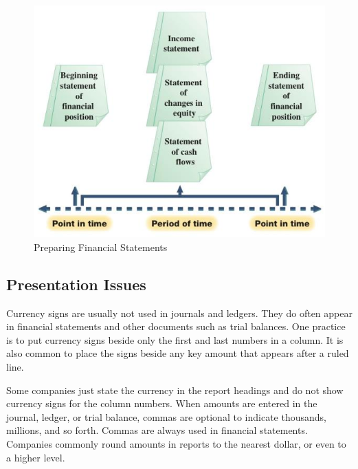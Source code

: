 \documentclass[../main.tex]{subfiles}
\begin{document}
	\begin{figure}[ht]
		\centering
		\includegraphics[width=1\columnwidth]{images/c2/preparing_financial_statements.png}
		\caption{Preparing Financial Statements}
	\end{figure}
	
	\subsection{Presentation Issues}
	
	Currency signs are usually not used in journals and ledgers. They do 
	often appear in financial statements and other documents such as trial 
	balances. 
	One practice is to put currency signs beside only the first and last 
	numbers in a column. It is also common to place the signs beside any key 
	amount that appears after a ruled line. 
	
	Some companies just state the currency in the report headings and do not 
	show currency signs for the column numbers. When amounts are entered in the 
	journal, ledger, or trial balance, commas are optional to indicate 
	thousands, millions, and so forth. Commas are always used in financial 
	statements. Companies commonly round amounts in reports to the nearest 
	dollar, or even to a higher level. 
	
\end{document}
